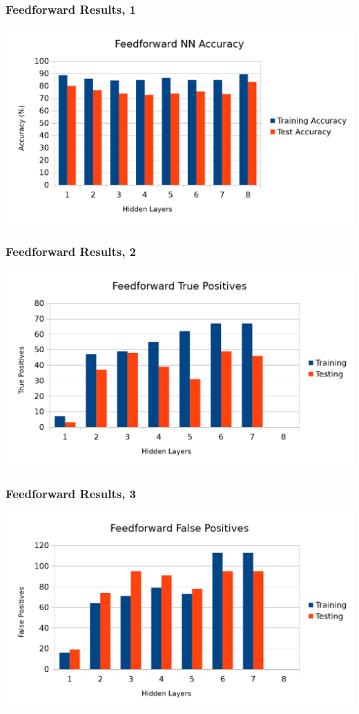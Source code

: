 \documentclass{beamer}
\begin{document}
\begin{frame}
	\frametitle{Feedforward Results, 1}
	\includegraphics[width=\textwidth]{images/ffacc.png}
\end{frame}
\begin{frame}
	\frametitle{Feedforward Results, 2}
	\includegraphics[width=\textwidth]{images/truepos.png}
\end{frame}
\begin{frame}
	\frametitle{Feedforward Results, 3}
	\includegraphics[width=\textwidth]{images/falsepos.png}
\end{frame}
\end{document}
